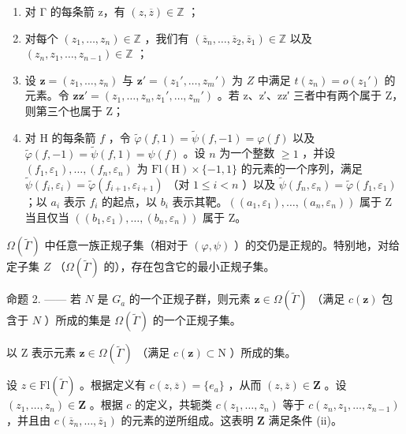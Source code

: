\begin{enumerate}
\def\labelenumi{(\roman{enumi})}
\item
  对 Γ 的每条箭 z，有 \((z,\overline{z})\in\mathbb{Z}\) ；
\item
  对每个 \((z_{1},\ldots ,z_{n})\in \mathbb{Z}\) ，我们有 \((\overline{z}_n,\dots ,\overline{z}_2,\overline{z}_1)\in \mathbb{Z}\) 以及 \((z_{n},z_{1},\ldots ,z_{n - 1})\in \mathbb{Z}\) ；
\item
  设 \(\mathbf{z} = (z_1, \ldots, z_n)\) 与 \(\mathbf{z}' = (z_1', \ldots, z_m')\) 为 \(Z\) 中满足 \(t(z_n) = o(z_1')\) 的元素。令 \(\mathbf{z}\mathbf{z}' = (z_1, \ldots, z_n, z_1', \ldots, z_m')\) 。若 z、z′、zz′ 三者中有两个属于 Z，则第三个也属于 Z；
\item
  对 H 的每条箭 \(f\) ，令 \(\widetilde{\varphi}(f,1) = \widetilde{\psi}(f,-1) = \varphi(f)\) 以及 \(\widetilde{\varphi}(f,-1) = \widetilde{\psi}(f,1) = \psi(f)\) 。设 \(n\) 为一个整数 \(\geqslant 1\) ，并设 \((f_1,\varepsilon_1),\ldots,(f_n,\varepsilon_n)\) 为 \(\mathrm{Fl}(\mathrm{H})\times \{-1,1\}\) 的元素的一个序列，满足 \(\widetilde{\psi}(f_i,\varepsilon_i) = \widetilde{\varphi}(f_{i+1},\varepsilon_{i+1})\) （对 \(1\leqslant i < n\) ）以及 \(\widetilde{\psi}(f_n,\varepsilon_n) = \widetilde{\varphi}(f_1,\varepsilon_1)\) ；以 \(a_i\) 表示 \(f_i\) 的起点，以 \(b_i\) 表示其靶。\(((a_1,\varepsilon_1),\ldots,(a_n,\varepsilon_n))\) 属于 Z 当且仅当 \(((b_1,\varepsilon_1),\ldots,(b_n,\varepsilon_n))\) 属于 Z。
\end{enumerate}

\(\Omega(\widetilde{\Gamma})\) 中任意一族正规子集（相对于 \((\varphi, \psi)\) ）的交仍是正规的。特别地，对给定子集 \(Z\) （\(\Omega(\widetilde{\Gamma})\) 的），存在包含它的最小正规子集。

命题 2. —— 若 \(N\) 是 \(G_{a}\) 的一个正规子群，则元素 \(\mathbf{z} \in \Omega(\widetilde{\Gamma})\) （满足 \(c(\mathbf{z})\) 包含于 \(N\) ）所成的集是 \(\Omega(\widetilde{\Gamma})\) 的一个正规子集。

以 Z 表示元素 \(\mathbf{z} \in \Omega(\widetilde{\Gamma})\) （满足 \(c(\mathbf{z}) \subset \mathrm{N}\) ）所成的集。

设 \(z \in \mathrm{Fl}(\widetilde{\Gamma})\) 。根据定义有 \(c(z, \overline{z}) = \{e_a\}\) ，从而 \((z, \overline{z}) \in \mathbf{Z}\) 。设 \((z_1, \ldots, z_n) \in \mathbf{Z}\) 。根据 \(c\) 的定义，共轭类 \(c(z_1, \ldots, z_n)\) 等于 \(c(z_n, z_1, \ldots, z_{n-1})\) ，并且由 \(c(\overline{z}_n, \ldots, \overline{z}_1)\) 的元素的逆所组成。这表明 \(\mathbf{Z}\) 满足条件 (ii)。

